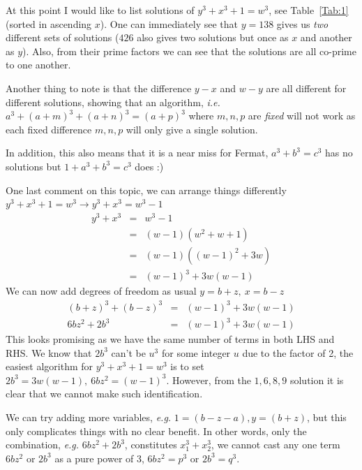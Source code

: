 \documentclass[aps,preprint,preprintnumbers,nofootinbib,showpacs,prd]{revtex4-1}
\newcommand{\ie}{{\it i.e.} }
\newcommand{\eg}{{\it e.g.} }
\newcommand{\nbea}{\begin{eqnarray*}}
\newcommand{\neea}{\end{eqnarray*}}
\begin{document}
\begin{enumerate}
At this point I would like to list solutions of $y^3 + x^3 + 1 = w^3$, see Table~\ref{Tab:1} (sorted in ascending $x$). One can immediately see that $y=138$ gives us {\it two} different sets of solutions ($426$ also gives two solutions but once as $x$ and another as $y$). Also, from their prime factors we can see that the solutions are all co-prime to one another.

Another thing to note is that the difference $y-x$ and $w-y$ are all different for different solutions, showing that an algorithm, \ie $a^3 + (a+m)^3 + (a+n)^3 = (a + p)^3$ where $m,n,p$ are {\it fixed} will not work as each fixed difference $m,n,p$ will only give a single solution. 

In addition, this also means that it is a near miss for Fermat, $a^3 + b^3 = c^3$ has no solutions but $1 + a^3 + b^3 = c^3$ does :)

One last comment on this topic, we can arrange things differently $y^3 + x^3 + 1 = w^3 \rightarrow y^3 + x^3 = w^3 - 1$
%
\nbea
y^3 + x^3 & = & w^3 - 1 \\
& = & (w-1)(w^2+w+1) \\
& = & (w-1)((w-1)^2+3w) \\
& = & (w-1)^3 + 3w(w-1)
\neea
%
We can now add degrees of freedom as usual $y = b+z, ~ x = b-z$
%
\nbea
(b+z)^3 + (b-z)^3 & = & (w-1)^3 + 3w(w-1) \\
6bz^2+2b^3 & = & (w-1)^3 + 3w(w-1)
\neea
%
This looks promising as we have the same number of terms in both LHS and RHS. We know that $2b^3$ can't be $u^3$ for some integer $u$ due to the factor of 2, the easiest algorithm for $y^3 + x^3 + 1 = w^3$ is to set $2b^3 = 3w(w-1), ~ 6bz^2 = (w-1)^3$. However, from the $1,6,8,9$ solution it is clear that we cannot make such identification.

We can try adding more variables, \eg $1=(b-z-a), y=(b+z)$, but this only complicates things with no clear benefit. In other words, only the combination, \eg $6bz^2+2b^3$, constitutes $x_1^3 + x_2^3$, we cannot cast any one term $6bz^2$ or $2b^3$ as a pure power of 3, $6bz^2 = p^3$ or $2b^3 = q^3$.


\end{enumerate}
\end{document}
